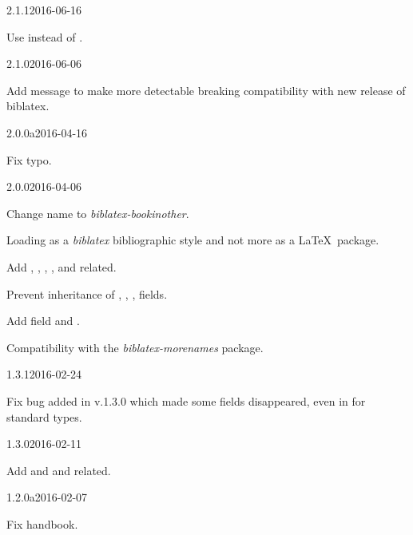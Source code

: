 \documentclass{ltxdockit}[2011/03/25]
\newcommand{\pkg}[1]{\emph{#1}}
\newcommand{\biblatex}{\emph{biblatex}\xspace}
\begin{document}
\begin{changelog}
\begin{release}{2.1.1}{2016-06-16}
  \item Use  instead of .
\end{release}

\begin{release}{2.1.0}{2016-06-06}
  \item Add message to make more detectable breaking compatibility with new release of biblatex.
\end{release}

\begin{release}{2.0.0a}{2016-04-16}
  \item Fix typo.
\end{release}

\begin{release}{2.0.0}{2016-04-06}
\item Change name to \pkg{biblatex-bookinother}.
\item Loading as a \biblatex bibliographic style and not more as a \LaTeX\ package.
\item Add , , , ,  and related.
\item Prevent inheritance of , , ,  fields.
\item Add field  and .
\item Compatibility with the \pkg{biblatex-morenames} package.
\end{release}

\begin{release}{1.3.1}{2016-02-24}
\item Fix bug added in v.1.3.0 which made some fields disappeared, even in for standard types.
\end{release}

\begin{release}{1.3.0}{2016-02-11}
\item Add  and  and related.
\end{release}

\begin{release}{1.2.0a}{2016-02-07}
\item Fix handbook.
\end{release}


\end{changelog}
\end{document}
